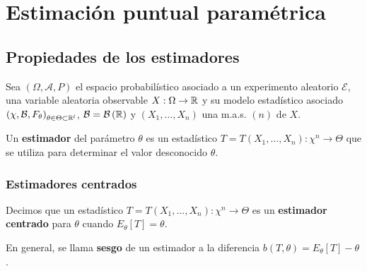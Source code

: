 \chapter{Estimación puntual paramétrica}
\section{Propiedades de los estimadores}
Sea $\displaystyle \left(\Omega, \mathcal{A}, P\right) $ el espacio probabilístico asociado a un experimento aleatorio $\displaystyle \mathcal{E} $, una variable aleatoria observable $\displaystyle X : \Omega \to \mathbb{R} $ y su modelo estadístico asociado $\displaystyle \left(\chi, \mathcal{B}, F_{\theta}\right)_{\theta\in\Theta\subset\mathbb{R}^{l}} $, $\displaystyle \mathcal{B}=\mathcal{B}\left(\mathbb{R}\right) $ y $\displaystyle \left(X_{1}, \ldots, X_{n}\right) $ una m.a.s. $\displaystyle \left(n\right) $ de $\displaystyle X $. 
\begin{definition}[Estimador]
Un \textbf{estimador} del parámetro $\displaystyle \theta $ es un estadístico $\displaystyle T = T\left(X_{1}, \ldots, X_{n}\right) : \chi^{n} \to \Theta$ que se utiliza para determinar el valor desconocido $\displaystyle \theta $. 
\end{definition}
\subsection{Estimadores centrados}
\begin{definition}
	Decimos que un estadístico $\displaystyle T = T\left(X_{1}, \ldots, X_{n}\right) : \chi^{n} \to \Theta $ es un \textbf{estimador centrado} para $\displaystyle \theta $ cuando $\displaystyle E_{\theta}\left[T\right] =\theta $.
\end{definition}

\begin{definition}[Sesgo]
	En general, se llama \textbf{sesgo} de un estimador a la diferencia $\displaystyle b\left(T, \theta\right)=E_{\theta}\left[T\right] -\theta $.
\end{definition}

